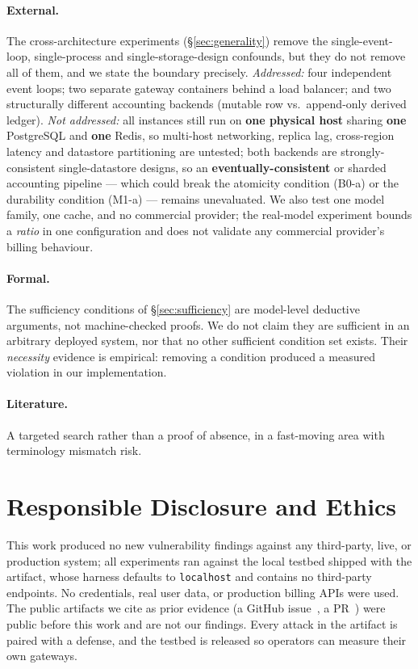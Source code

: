 \documentclass[11pt]{article}
\begin{document}
\paragraph{External.} The cross-architecture experiments (\S\ref{sec:generality}) remove
the single-event-loop, single-process and single-storage-design confounds, but they do not
remove all of them, and we state the boundary precisely. \emph{Addressed:} four
independent event loops; two separate gateway containers behind a load balancer; and two
structurally different accounting backends (mutable row vs.\ append-only derived ledger).
\emph{Not addressed:} all instances still run on \textbf{one physical host} sharing
\textbf{one} PostgreSQL and \textbf{one} Redis, so multi-host networking, replica lag,
cross-region latency and datastore partitioning are untested; both backends are
strongly-consistent single-datastore designs, so an \textbf{eventually-consistent} or
sharded accounting pipeline --- which could break the atomicity condition (B0-a) or the
durability condition (M1-a) --- remains unevaluated. We also test one model family, one
cache, and no commercial provider; the real-model experiment bounds a \emph{ratio} in one
configuration and does not validate any commercial provider's billing behaviour.

\paragraph{Formal.} The sufficiency conditions of \S\ref{sec:sufficiency} are model-level
deductive arguments, not machine-checked proofs. We do not claim they are sufficient in an
arbitrary deployed system, nor that no other sufficient condition set exists. Their
\emph{necessity} evidence is empirical: removing a condition produced a measured violation
in our implementation.

\paragraph{Literature.} A targeted search rather than a proof of absence, in a
fast-moving area with terminology mismatch risk.

\section{Responsible Disclosure and Ethics}
This work produced no new vulnerability findings against any third-party, live, or
production system; all experiments ran against the local testbed shipped with the
artifact, whose harness defaults to \texttt{localhost} and contains no third-party
endpoints. No credentials, real user data, or production billing APIs were used. The
public artifacts we cite as prior evidence (a GitHub issue~\cite{newapi5235}, a
PR~\cite{aperture247}) were public before this work and are not
our findings. Every attack in the artifact is paired with a defense, and the testbed is
released so operators can measure their own gateways.
\end{document}
